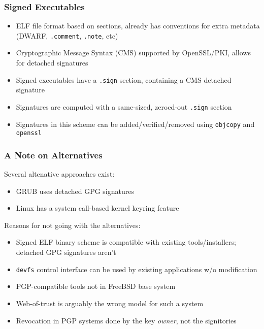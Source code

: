 \documentclass{beamer}
\begin{document}
\begin{frame}
  \frametitle{Signed Executables}
  \begin{itemize}
  \item ELF file format based on sections, already has conventions for
    extra metadata (DWARF, \texttt{.comment}, \texttt{.note}, etc)
  \item Cryptographic Message Syntax (CMS) supported by OpenSSL/PKI,
    allows for detached signatures
  \item Signed executables have a \texttt{.sign} section, containing a
    CMS detached signature
  \item Signatures are computed with a same-sized, zeroed-out
    \texttt{.sign} section
  \item Signatures in this scheme can be added/verified/removed using
    \texttt{objcopy} and \texttt{openssl}
  \end{itemize}
\end{frame}

\begin{frame}
  \frametitle{A Note on Alternatives}

  Several altenative approaches exist:
  \begin{itemize}
  \item GRUB uses detached GPG signatures
  \item Linux has a system call-based kernel keyring feature
  \end{itemize}

  Reasons for not going with the alternatives:
  \begin{itemize}
  \item Signed ELF binary scheme is compatible with existing
    tools/installers; detached GPG signatures aren't
  \item \texttt{devfs} control interface can be used by existing
    applications w/o modification
  \item PGP-compatible tools not in FreeBSD base system
  \item Web-of-trust is arguably the wrong model for such a system
  \item Revocation in PGP systems done by the key \emph{owner}, not
    the signitories
  \end{itemize}
\end{frame}
\end{document}
